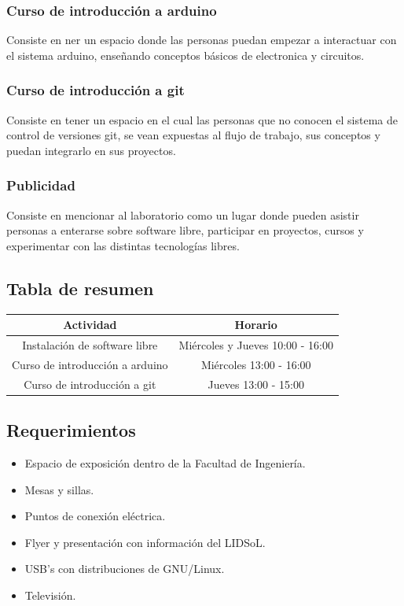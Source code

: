 \documentclass[a4paper,11pt]{article}                 %
\begin{document}
    \subsubsection{Curso de introducción a arduino}
      Consiste en ner un espacio donde las personas puedan empezar a interactuar con el sistema arduino, enseñando conceptos básicos de electronica y circuitos.
    \subsubsection{Curso de introducción a git}
      Consiste en tener un espacio en el cual las personas que no conocen el sistema de control de versiones git, se vean expuestas al flujo de trabajo, sus conceptos y puedan integrarlo en sus proyectos.
    \subsubsection{Publicidad}
      Consiste en mencionar al laboratorio como un lugar donde pueden asistir personas a enterarse sobre software libre, participar en proyectos, cursos y experimentar con las distintas tecnologías libres.
  \subsection{Tabla de resumen}
    \begin{center}
    \begin{tabular}{|c | c|}
      \hline
      Actividad & Horario \\
      \hline
      Instalación de software libre & Miércoles y Jueves 10:00 - 16:00 \\
      Curso de introducción a arduino & Miércoles 13:00 - 16:00 \\
      Curso de introducción a git & Jueves 13:00 - 15:00 \\
      \hline
    \end{tabular}
    \end{center}
  \subsection{Requerimientos}
    \begin{itemize}
      \item Espacio de exposición dentro de la Facultad de Ingeniería.
      \item Mesas y sillas.
      \item Puntos de conexión eléctrica.
      \item Flyer y presentación con información del LIDSoL.
      \item USB's con distribuciones de GNU/Linux.
      \item Televisión.
    \end{itemize}
\end{document}

